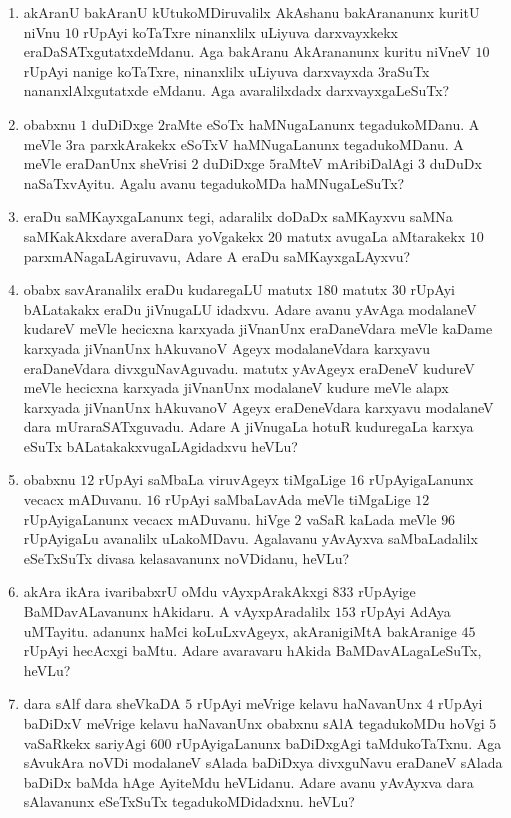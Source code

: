 \begin{enumerate}
\item akAranU bakAranU kUtukoMDiruvalilx AkAshanu bakArananunx kuritU
niVnu $10$ rUpAyi koTaTxre ninanxlilx uLiyuva darxvayxkekx
eraDaSATxgutatxdeMdanu. Aga bakAranu AkArananunx kuritu niVneV $10$
rUpAyi nanige koTaTxre, ninanxlilx uLiyuva darxvayxda $3$raSuTx
nananxlAlxgutatxde eMdanu. Aga avaralilxdadx darxvayxgaLeSuTx?

\item obabxnu $1$ duDiDxge $2$raMte eSoTx haMNugaLanunx
tegadukoMDanu. A meVle $3$ra parxkArakekx eSoTxV haMNugaLanunx
tegadukoMDanu. A meVle eraDanUnx sheVrisi $2$ duDiDxge $5$raMteV
mAribiDalAgi $3$ duDuDx naSaTxvAyitu. Agalu avanu tegadukoMDa
haMNugaLeSuTx? 

\item eraDu saMKayxgaLanunx tegi, adaralilx doDaDx saMKayxvu saMNa
saMKakAkxdare averaDara yoVgakekx $20$ matutx avugaLa aMtarakekx $10$
parxmANagaLAgiruvavu, Adare A eraDu saMKayxgaLAyxvu?

\item obabx savAranalilx eraDu kudaregaLU matutx $180$ matutx $30$
rUpAyi bALatakakx eraDu jiVnugaLU idadxvu. Adare avanu yAvAga
modalaneV kudareV meVle hecicxna karxyada jiVnanUnx eraDaneVdara meVle
kaDame karxyada jiVnanUnx hAkuvanoV Ageyx modalaneVdara karxyavu
eraDaneVdara divxguNavAguvadu. matutx \hbox{yAvAgeyx} eraDeneV kudureV meVle
hecicxna karxyada jiVnanUnx modalaneV kudure meVle alapx karxyada
jiVnanUnx hAkuvanoV Ageyx eraDeneVdara karxyavu modalaneV dara
mUraraSATxguvadu. Adare A jiVnugaLa hotuR kuduregaLa karxya eSuTx
bALatakakxvugaLAgidadxvu heVLu?

\item obabxnu $12$ rUpAyi saMbaLa viruvAgeyx tiMgaLige $16$
rUpAyigaLanunx vecacx mADuvanu. $16$ rUpAyi saMbaLavAda meVle tiMgaLige
$12$ rUpAyigaLanunx vecacx mADuvanu. hiVge $2$ vaSaR kaLada meVle $96$
rUpAyigaLu avanalilx uLakoMDavu. Agalavanu yAvAyxva saMbaLadalilx
eSeTxSuTx divasa kelasavanunx noVDidanu, heVLu?

\item akAra ikAra ivaribabxrU oMdu vAyxpArakAkxgi $833$ rUpAyige
BaMDavALavanunx hAkidaru. A vAyxpAradalilx $153$ rUpAyi AdAya
uMTayitu. adanunx haMci koLuLxvAgeyx, akAranigiMtA bakAranige $45$
rUpAyi hecAcxgi baMtu. Adare avaravaru hAkida BaMDavALagaLeSuTx,
heVLu?

\item dara sAlf dara sheVkaDA $5$ rUpAyi meVrige kelavu haNavanUnx $4$
rUpAyi baDiDxV meVrige kelavu haNavanUnx obabxnu sAlA tegadukoMDu
hoVgi $5$ vaSaRkekx sariyAgi $600$ rUpAyigaLanunx baDiDxgAgi
taMdukoTaTxnu. Aga sAvukAra noVDi modalaneV sAlada baDiDxya divxguNavu
eraDaneV sAlada baDiDx baMda hAge AyiteMdu heVLidanu. Adare avanu
yAvAyxva dara sAlavanunx eSeTxSuTx tegadukoMDidadxnu. heVLu?


\end{enumerate}
